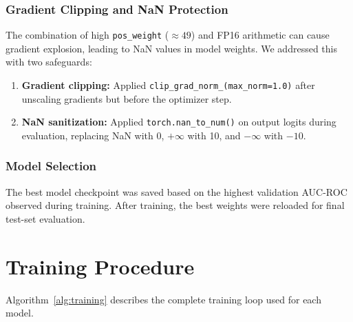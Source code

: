 \documentclass[11pt, a4paper, twocolumn]{article}
\begin{document}
\subsubsection{Gradient Clipping and NaN Protection}

The combination of high \texttt{pos\_weight} ($\approx 49$) and FP16
arithmetic can cause gradient explosion, leading to NaN values in
model weights. We addressed this with two safeguards:

\begin{enumerate}[noitemsep]
    \item \textbf{Gradient clipping:} Applied
          \texttt{clip\_grad\_norm\_(max\_norm=1.0)} after unscaling
          gradients but before the optimizer step.
    \item \textbf{NaN sanitization:} Applied
          \texttt{torch.nan\_to\_num()} on output logits during
          evaluation, replacing NaN with 0, $+\infty$ with 10, and
          $-\infty$ with $-10$.
\end{enumerate}

\subsubsection{Model Selection}

The best model checkpoint was saved based on the highest validation
AUC-ROC observed during training. After training, the best weights
were reloaded for final test-set evaluation.

\section{Training Procedure}
\label{sec:training_procedure}

Algorithm~\ref{alg:training} describes the complete training loop
used for each model.
\end{document}

